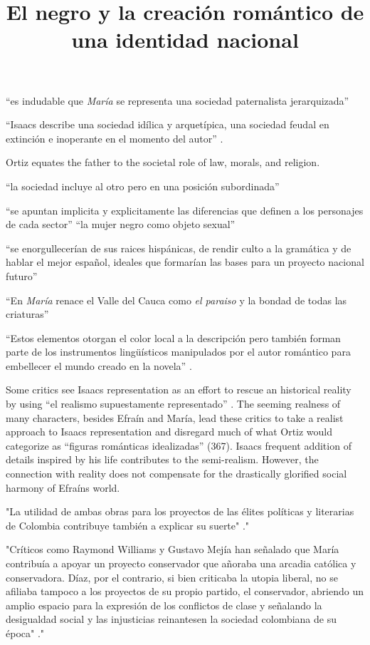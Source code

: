 \documentclass[12pt]{article}
\title{El negro y la creación romántico de una identidad nacional}
\makeatletter
\newcommand\iraggedright{%
	\let\\\@centercr\@rightskip\@flushglue \rightskip\@rightskip
	\leftskip\z@skip}
\makeatother
\begin{document}
	\makeheader
	\iraggedright

\enquote{es indudable que \textit{María} se representa una sociedad paternalista jerarquizada} \cite[362]{Ortiz2007}

\enquote{Isaacs describe una sociedad idílica y arquetípica, una sociedad feudal en extinción e inoperante en el momento del autor} \cite[362]{Ortiz2007}.

Ortiz equates the father to the societal role of law, morals, and religion. 

\enquote{la sociedad incluye al otro pero en una posición subordinada} \cite[363]{Ortiz2007}

\enquote{se apuntan implicita y explicitamente las diferencias que definen a los personajes de cada sector} \cite[364]{Ortiz2007}
\enquote{la mujer negro como objeto sexual}

\enquote{se enorgullecerían de sus raices hispánicas, de rendir culto a la gramática y de hablar el mejor español, ideales que formarían las bases para un proyecto nacional futuro} \cite[365]{Ortiz2007}

\enquote{En \textit{María} renace el Valle del Cauca como \textit{el paraiso} y la bondad de todas las criaturas} \cite[366]{Ortiz2007}

\enquote{Estos elementos otorgan el color local a la descripción pero también forman parte de los instrumentos lingüísticos manipulados por el autor romántico para embellecer el mundo creado en la novela} \cite[367]{Ortiz2007}.

Some critics see Isaacs representation as an effort to rescue an historical reality by using \enquote{el realismo supuestamente representado} \cite[367]{Ortiz2007}. The seeming realness of many characters, besides Efraín and María, lead these critics to take a realist approach to Isaacs representation and disregard much of what Ortiz would categorize as \enquote{figuras románticas idealizadas} (367)\nocite{Ortiz2007}. Isaacs frequent addition of details inspired by his life contributes to the semi-realism. However, the connection with reality does not compensate for the drastically glorified social harmony of Efraíns world.

"La utilidad de ambas obras para los proyectos de las élites políticas y literarias de Colombia contribuye también a explicar su suerte" \cite[141]{ortiz2002}."

"Críticos como Raymond Williams y Gustavo Mejía han señalado que María contribuía a apoyar un proyecto conservador que añoraba una arcadia católica y conservadora. Díaz, por el contrario, si bien criticaba la utopia liberal, no se afiliaba tampoco a los proyectos de su propio partido, el conservador, abriendo un amplio espacio para la expresión de los conflictos de clase y señalando la desigualdad social y las injusticias reinantesen la sociedad colombiana de su época" \cite[141]{ortiz2002}."
\end{document}
